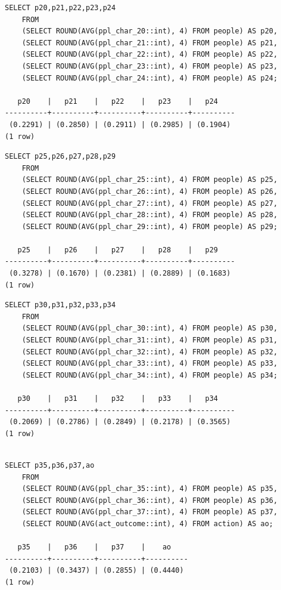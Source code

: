\documentclass[]{report}
\begin{document}
\begin{verbatim}
SELECT p20,p21,p22,p23,p24
    FROM
    (SELECT ROUND(AVG(ppl_char_20::int), 4) FROM people) AS p20,
    (SELECT ROUND(AVG(ppl_char_21::int), 4) FROM people) AS p21,
    (SELECT ROUND(AVG(ppl_char_22::int), 4) FROM people) AS p22,
    (SELECT ROUND(AVG(ppl_char_23::int), 4) FROM people) AS p23,
    (SELECT ROUND(AVG(ppl_char_24::int), 4) FROM people) AS p24;

   p20    |   p21    |   p22    |   p23    |   p24
----------+----------+----------+----------+----------
 (0.2291) | (0.2850) | (0.2911) | (0.2985) | (0.1904)
(1 row)
\end{verbatim}

\pagebreak

\begin{verbatim}
SELECT p25,p26,p27,p28,p29
    FROM
    (SELECT ROUND(AVG(ppl_char_25::int), 4) FROM people) AS p25,
    (SELECT ROUND(AVG(ppl_char_26::int), 4) FROM people) AS p26,
    (SELECT ROUND(AVG(ppl_char_27::int), 4) FROM people) AS p27,
    (SELECT ROUND(AVG(ppl_char_28::int), 4) FROM people) AS p28,
    (SELECT ROUND(AVG(ppl_char_29::int), 4) FROM people) AS p29;

   p25    |   p26    |   p27    |   p28    |   p29
----------+----------+----------+----------+----------
 (0.3278) | (0.1670) | (0.2381) | (0.2889) | (0.1683)
(1 row)
\end{verbatim}

\begin{verbatim}
SELECT p30,p31,p32,p33,p34
    FROM
    (SELECT ROUND(AVG(ppl_char_30::int), 4) FROM people) AS p30,
    (SELECT ROUND(AVG(ppl_char_31::int), 4) FROM people) AS p31,
    (SELECT ROUND(AVG(ppl_char_32::int), 4) FROM people) AS p32,
    (SELECT ROUND(AVG(ppl_char_33::int), 4) FROM people) AS p33,
    (SELECT ROUND(AVG(ppl_char_34::int), 4) FROM people) AS p34;

   p30    |   p31    |   p32    |   p33    |   p34
----------+----------+----------+----------+----------
 (0.2069) | (0.2786) | (0.2849) | (0.2178) | (0.3565)
(1 row)
\end{verbatim}

\begin{verbatim}

SELECT p35,p36,p37,ao
    FROM
    (SELECT ROUND(AVG(ppl_char_35::int), 4) FROM people) AS p35,
    (SELECT ROUND(AVG(ppl_char_36::int), 4) FROM people) AS p36,
    (SELECT ROUND(AVG(ppl_char_37::int), 4) FROM people) AS p37,
    (SELECT ROUND(AVG(act_outcome::int), 4) FROM action) AS ao;    

   p35    |   p36    |   p37    |    ao
----------+----------+----------+----------
 (0.2103) | (0.3437) | (0.2855) | (0.4440)
(1 row)
\end{verbatim}
\end{document}
